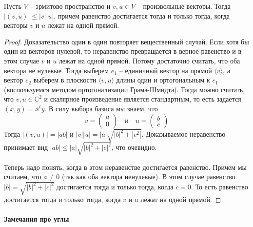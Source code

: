 \begin{claim}
Пусть $V$ -- эрмитово пространство и $v,u\in V$ -- произвольные векторы.
Тогда $|(v,u)|\leqslant |v| |u|$, причем равенство достигается тогда и только тогда, когда векторы $v$ и $u$ лежат на одной прямой.
\end{claim}
\begin{proof}
Доказательство один в один повторяет вещественный случай.
Если хотя бы один из векторов нулевой, то неравенство превращается в верное равенство и в этом случае $v$ и $u$ лежат на одной прямой.
Потому достаточно считать, что оба вектора не нулевые.
Тогда выберем $e_1$ -- единичный вектор на прямой $\langle v\rangle$, а вектор $e_2$ выберем в плоскости $\langle v, u \rangle$ длины один и ортогональным к $e_1$ (воспользуемся методом ортогонализации Грама-Шмидта).
Тогда можно считать, что $v,u\in \mathbb C^2$ и скалярное произведение является стандартным, то есть задается $(x, y) = \bar x^t y$.
В силу выбора базиса мы знаем, что 
\[
v=
\begin{pmatrix}
{a}\\{0}
\end{pmatrix}
\quad \text{и} \quad
u =
\begin{pmatrix}
{b}\\{c}
\end{pmatrix}
\]
Тогда $|(v,u)| = |ab|$ и $|v||u| = |a|\sqrt{|b|^2 + |c^2|}$.
Доказываемое неравенство принимает вид $|ab|\leqslant |a|\sqrt{|b|^2+|c|^2}$, что очевидно.

Теперь надо понять, когда в этом неравенстве достигается равенство.
Причем мы считаем, что $a\neq 0 $ (так как оба вектора ненулевые).
В этом случае равенство $|b| = \sqrt{|b|^2+|c|^2}$ достигается тогда и только тогда, когда $c = 0$.
То есть равенство достигается тогда и только тогда, когда $ v$ и $u$ лежат на одной прямой.
\end{proof}

\paragraph{Замечания про углы}


